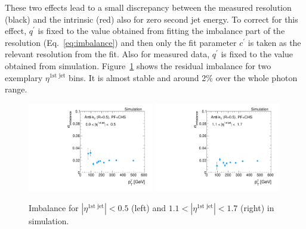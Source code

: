These two effects lead to a small discrepancy between the measured resolution (black) and the intrinsic (red) also for zero second jet energy. 
To correct for this effect,  $q^{\prime}$ is fixed to the value obtained 
from fitting the imbalance part of the resolution (Eq.~\eqref{eq:imbalance}) and then only the fit parameter  $c^{\prime}$ is taken as the relevant resolution from the fit.
Also for measured data, $q^{\prime}$ is fixed to the value obtained from simulation. 
\mbox{Figure \ref{fig:ImbalanceOfPtgamma}} shows the residual imbalance for two exemplary $\eta^{\text{1st jet}}$ bins. 
It is almost stable and around 2\% over the whole photon \pt range.
\begin{figure}[tbp]
  \centering
    \includegraphics[width=0.49\textwidth]{figures/resolution/methodology/Imbalance_for_1_eta_bin_PFCHS_mc_RMS99.pdf}
    \includegraphics[width=0.49\textwidth]{figures/resolution/methodology/Imbalance_for_3_eta_bin_PFCHS_mc_RMS99.pdf}
  \caption{Imbalance for $|\eta^{\text{1st jet}}| < 0.5$ (left) and $1.1<|\eta^{\text{1st jet}}| < 1.7$ (right) in simulation.}  
  \label{fig:ImbalanceOfPtgamma}
\end{figure}

